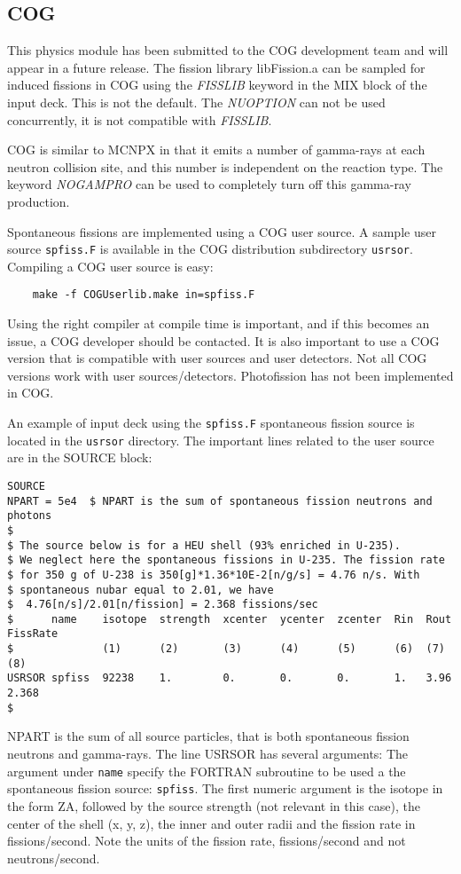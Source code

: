 \pagebreak
\subsection{COG}
This physics module has been submitted to the COG development team
and will appear in a future release.  The fission library libFission.a
can be sampled for induced fissions in COG using the \textit{FISSLIB}
keyword in the MIX block of the input deck. This is not the
default. The \textit{NUOPTION} can not be used concurrently, it is not
compatible with \textit{FISSLIB}.

COG is similar to MCNPX in that it emits a number of gamma-rays
at each neutron collision site, and this number is independent
on the reaction type. The keyword \textit{NOGAMPRO} can be used
to completely turn off this gamma-ray production.

Spontaneous fissions are implemented using a COG user source.
A sample user source {\tt spfiss.F} is available in the COG distribution 
subdirectory {\tt usrsor}. Compiling a COG user source is easy:
\begin{verbatim}
	make -f COGUserlib.make in=spfiss.F
\end{verbatim}
Using the right compiler at compile time is important, and if this
becomes an issue, a COG developer should be contacted. It is also 
important to use a COG version that is compatible with user
sources and user detectors. Not all COG versions work with
user sources/detectors. Photofission has not been implemented in
COG.

An example of input deck using the {\tt spfiss.F} spontaneous
fission source is located in the {\tt usrsor} directory. The important
lines related to the user source are in the SOURCE block:

{ \small
\begin{verbatim}
SOURCE
NPART = 5e4  $ NPART is the sum of spontaneous fission neutrons and photons
$ 
$ The source below is for a HEU shell (93% enriched in U-235).
$ We neglect here the spontaneous fissions in U-235. The fission rate 
$ for 350 g of U-238 is 350[g]*1.36*10E-2[n/g/s] = 4.76 n/s. With
$ spontaneous nubar equal to 2.01, we have 
$  4.76[n/s]/2.01[n/fission] = 2.368 fissions/sec
$      name    isotope  strength  xcenter  ycenter  zcenter  Rin  Rout  FissRate
$              (1)      (2)       (3)      (4)      (5)      (6)  (7)   (8)
USRSOR spfiss  92238    1.        0.       0.       0.       1.   3.96  2.368
$
\end{verbatim}
}
NPART is the sum of all source particles, that is both spontaneous
fission neutrons and gamma-rays. The line USRSOR has several arguments:
The argument under {\tt name} specify the FORTRAN subroutine to be used a 
the spontaneous fission source: {\tt spfiss}. The first numeric argument is 
the isotope in the form ZA, followed by the source strength (not relevant
in this case), the center of the shell (x, y, z), the inner and outer
radii and the fission rate in fissions/second. Note the units of the
fission rate, fissions/second and not neutrons/second.

